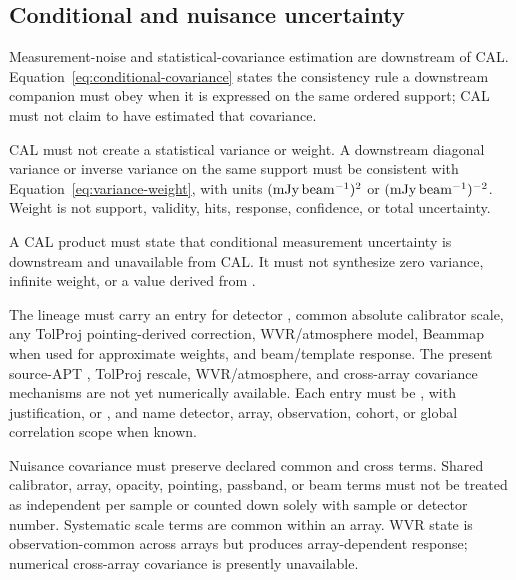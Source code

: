 \subsection{Conditional and nuisance uncertainty}

\begin{description}[style=nextline]
\item[\Req{032}: downstream conditional covariance boundary.]
  Measurement-noise and statistical-covariance estimation are downstream of
  CAL. Equation~\eqref{eq:conditional-covariance} states the consistency rule
  a downstream companion must obey when it is expressed on the same ordered
  support; CAL must not claim to have estimated that covariance.

\item[\Req{033}: scalar variance and weight boundary.]
  CAL must not create a statistical variance or weight. A downstream diagonal
  variance or inverse variance on the same support must be consistent with
  Equation~\eqref{eq:variance-weight}, with units \((\mathrm{mJy\,beam^{-1}})^2\) or
  \((\mathrm{mJy\,beam^{-1}})^{-2}\). Weight is not support, validity, hits, response,
  confidence, or total uncertainty.

\item[\Req{034}: unavailable conditional uncertainty.]
  A CAL product must state that conditional measurement uncertainty is
  downstream and unavailable from CAL. It must not synthesize zero variance,
  infinite weight, or a value derived from .

\item[\Req{035}: nuisance completeness ledger.]
  The lineage must carry an entry for detector , common
  absolute calibrator scale, any TolProj pointing-derived correction,
  WVR/atmosphere model, Beammap  when used for approximate weights,
  and beam/template response. The present source-APT , TolProj
  rescale, WVR/atmosphere, and cross-array covariance mechanisms are not yet
  numerically available. Each entry must be ,
   with justification, or , and name
  detector, array, observation, cohort, or global correlation scope when
  known.

\item[\Req{036}: correlation preservation.]
  Nuisance covariance must preserve declared common and cross terms. Shared
  calibrator, array, opacity, pointing, passband, or beam terms must not be
  treated as independent per sample or counted down solely with sample or
  detector number. Systematic scale terms are common within an array. WVR
  state is observation-common across arrays but produces array-dependent
  response; numerical cross-array covariance is presently unavailable.


\end{description}
